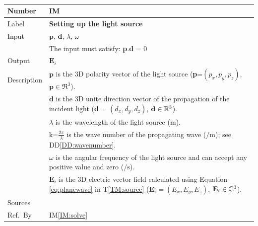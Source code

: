 \documentclass[12pt]{article}
\newcommand{\colBwidth}{0.82\textwidth} \newcommand{\colCwidth}{0.1\textwidth}
\newcounter{instnum} %
\begin{document}
	~\newline \noindent \begin{minipage}{\textwidth}
		\renewcommand*{\arraystretch}{1.5} \begin{tabular}{| p{\colAwidth} |
				p{\colBwidth}|} \hline \rowcolor[gray]{0.9} Number&
			IM{instnum}\theinstnum \label{IM:source}\\ \hline Label& \bf
			Setting up the light source\\ \hline Input&$\textbf{p}$, $\textbf{d}$,
			$\lambda$, $\omega$ \\ & The input must satisfy: \textbf{p}.\textbf{d} = 0 \\
			\hline Output&$\textbf{E}_i$ \\ \hline Description&$\textbf{p}$ is the 3D
			polarity vector of the light source (\textbf{p}=$(p_x,p_y,p_z)$, $\textbf{p} \in
			\Re^3$).\\ &$\textbf{d}$ is the 3D unite direction vector of the propagation
			of the incident light (\textbf{d} = $(d_x,d_y,d_z)$, $\textbf{d}\in \Bbb
			R^3$).\\ &$\lambda$ is the wavelength of the light source ($\si{\meter}$).\\
			&k=$\frac{2 \pi}{\lambda}$ is the wave number of the propagating wave ($\si{\per
				\meter}$); see DD\ref{DD:wavenumber}.\\ & $\omega$ is the angular frequency of the light source and can
			accept any positive value and zero ($\si{\per \second}$).\\ &$\textbf{E}_i$ is
			the 3D electric vector field calculated using Equation \ref{eq:planewave} in
			T\ref{TM:source} ($\textbf{E}_i=(E_x,E_y,E_z)$, $\textbf{E}_i\in \Bbb C^3$). \\
			\hline Sources& \cite{monk2003finite} \\ \hline Ref.\ By & IM\ref{IM:solve}\\ \hline \end{tabular} \end{minipage}\\
	
	
	
	
	
	
	
\end{document}
